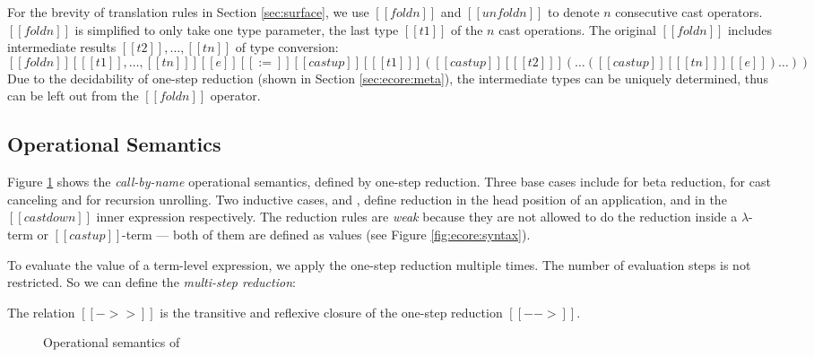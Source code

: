 For the brevity of translation rules in Section \ref{sec:surface},
we use $[[foldn]]$ and $[[unfoldn]]$ to denote
$n$ consecutive cast operators. $[[foldn]]$ is simplified to only take
one type parameter, the last type $[[t1]]$ of the $n$ cast operations.
The original $[[foldn]]$ includes intermediate results $[[t2]], \dots, [[tn]]$
of type conversion:
\[
    [[foldn]] [ [[t1]], \dots, [[tn]] ] [[e]]  [[:=]] [[castup]] [
    [[t1]] ] ([[castup]] [ [[t2]] ] (\dots ( [[castup]] [ [[tn]] ]
  [[e]] ) \dots ))
\]
Due to the decidability of one-step reduction (shown in Section 
\ref{sec:ecore:meta}), the intermediate types can be uniquely determined, 
thus can be left out from the $[[foldn]]$ operator.

\subsection{Operational Semantics}\label{sec:ecore:opsem}

Figure \ref{fig:ecore:opsem} shows the \emph{call-by-name} operational
semantics, defined by one-step reduction. Three base cases include
 for beta reduction,  for
cast canceling and  for recursion unrolling.
Two inductive cases,  and
, define reduction in the head position of an
application, and in the $[[castdown]]$ inner expression respectively.
The reduction rules are \emph{weak} because they are not allowed to do
the reduction inside a $\lambda$-term or $[[castup]]$-term --- both of
them are defined as values (see Figure \ref{fig:ecore:syntax}).

To evaluate the value of a term-level expression, we apply the
one-step reduction multiple times. The number of evaluation steps is
not restricted. So we can define the \emph{multi-step reduction}:

\begin{definition}
    The relation $[[->>]]$ is the transitive and reflexive closure of
    the one-step reduction $[[-->]]$.
\end{definition}

\begin{figure}[t]
\small
\begin{spacing}{0.7}
    \ottdefnstep{}
    \ottusedrule{\ottdruleSXXMu{}}
\end{spacing}
    \caption{Operational semantics of \name}
    \label{fig:ecore:opsem}
\end{figure}

